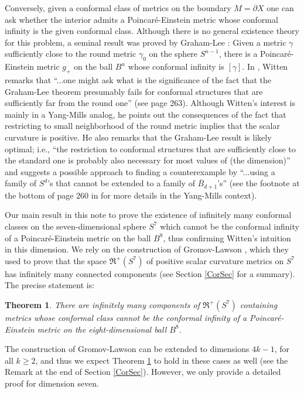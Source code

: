 \documentclass{amsart}
\newtheorem{theorem}{Theorem}[section]
\theoremstyle{definition}
\theoremstyle{remark}
\numberwithin{equation}{section}
\begin{document}
Conversely, given a conformal class of metrics on the boundary $M = \partial X$ one can ask whether the interior admits a Poincar\'e-Einstein metric whose conformal infinity is the given conformal class.  Although there is no general existence theory for this problem, a seminal result was proved by Graham-Lee \cite{GL}: Given a metric $\gamma$ sufficiently close to the round metric $\gamma_0$ on the sphere $S^{n-1}$, there is a Poincar\'e-Einstein metric $g_{+}$ on the ball $B^{n}$ whose conformal infinity is $[\gamma]$. In \cite{WittenHolo}, Witten remarks that ``...one might ask what is the significance of the fact that the
Graham-Lee theorem presumably fails for conformal structures that are sufficiently far from the round one'' (see page 263).  Although Witten's interest is mainly in a Yang-Mills analog, he points out the consequences of the fact that restricting to small neighborhood of the round metric implies that the scalar curvature is positive.  He also remarks that the Graham-Lee result is likely optimal; i.e., ``the restriction to conformal structures that are sufficiently close to the standard one is probably also necessary for most values of (the dimension)'' and suggests a possible approach to finding a counterexample by ``...using a family of $S^d$'s that cannot be extended to a family of $\overline{B}_{d+1}$'s'' (see the footnote at the bottom of page 260 in \cite{WittenHolo} for more details in the Yang-Mills context).

Our main result in this note to prove the existence of infinitely many conformal classes on the seven-dimensional sphere $S^7$ which cannot be the conformal infinity of a Poincar\'e-Einstein metric on the ball $B^8$, thus confirming Witten's intuition in this dimension.  We rely on the construction of Gromov-Lawson \cite{GL}, which they used to prove that the space $\mathfrak{R}^{+}(S^7)$ of positive scalar curvature metrics on $S^7$ has infinitely many connected components (see Section \ref{CorSec} for a summary).   The precise statement is:

\begin{theorem} \label{MainIntro} There are infinitely many components of $\mathfrak{R}^{+}(S^7)$ containing metrics whose conformal class cannot be the conformal infinity of a Poincar\'e-Einstein metric on the eight-dimensional ball $B^8$.
\end{theorem}


The construction of Gromov-Lawson can be extended to dimensions $4k -1$, for all $k \geq 2$, and thus we expect Theorem \ref{MainIntro} to hold in these cases as well (see the Remark at the end of Section \ref{CorSec}).  However, we only provide a detailed proof for dimension seven.
\end{document}
